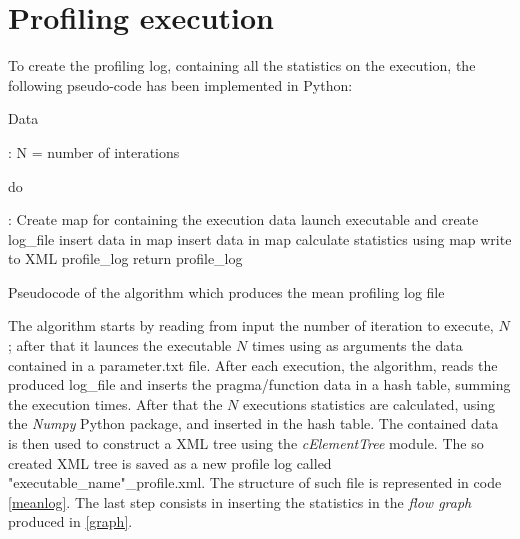 \documentclass[a4paper,11pt,oneside]{book}
\begin{document}
\section{Profiling execution}

To create the profiling log, containing all the statistics on the execution, the following pseudo-code has been implemented in Python:

\begin{algorithm}[H]
\begin{algorithmic}
 \State \begin{bf}Data\end{bf}:{ N = number of interations}
\State \begin{bf}do\end{bf}: Create map for containing the execution data
\State launch executable and create log\_file
\State insert data in map
\EndFor
{}
\State insert data in map
\EndFor
\EndFor
\State calculate statistics using map\;
\State write to XML profile\_log
\EndFor
\State return profile\_log
\end{algorithmic}
\caption{Pseudocode of the algorithm which produces the mean profiling log file}
\end{algorithm}

The algorithm starts by reading from input the number of iteration to execute, $N$; after that it launces the executable $N$ times using as arguments the data contained in a parameter.txt file. After each execution, the algorithm, reads the produced log\_file and inserts the pragma/function data in a hash table, summing the execution times. After that the $N$ executions statistics are calculated, using the \emph{Numpy} Python package, and inserted in the hash table. The contained data is then used to construct a XML tree using the \emph{cElementTree} module. The so created XML tree is saved as a new profile log called "executable\_name"\_profile.xml. The structure of such file is represented in code \ref{meanlog}. The last step consists in inserting the statistics in the \emph{flow graph} produced in \ref{graph}.
\end{document}
